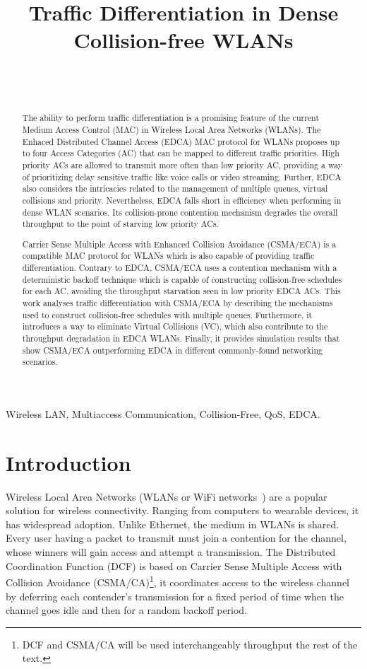\documentclass[a4paper,journal]{IEEEtran}
\title{Traffic Differentiation in Dense Collision-free WLANs}
\author{\IEEEauthorblockN{Luis Sanabria-Russo\IEEEauthorrefmark{0}, Boris Bellalta\IEEEauthorrefmark{0}}\\
      \IEEEauthorblockA{\IEEEauthorrefmark{0}Department of Information and Communication Technologies \\ Universitat Pompeu Fabra, Barcelona, Spain
      \\\ {\tt \{luis.sanabria,boris.bellalta\}@upf.edu}}\\
  }
\begin{document}
\maketitle

\begin{abstract}
The ability to perform traffic differentiation is a promising feature of the current Medium Access Control (MAC) in Wireless Local Area Networks (WLANs). The Enhaced Distributed Channel Access (EDCA) MAC protocol for WLANs proposes up to four Access Categories (AC) that can be mapped to different traffic priorities. High priority ACs are allowed to transmit more often than low priority AC, providing a way of prioritizing delay sensitive traffic like voice calls or video streaming. Further, EDCA also considers the intricacies related to the management of multiple queues, virtual collisions and priority. Nevertheless, EDCA falls short in efficiency when performing in dense WLAN scenarios. Its collision-prone contention mechanism degrades the overall throughput to the point of starving low priority ACs.

Carrier Sense Multiple Access with Enhanced Collision Avoidance (CSMA/ECA) is a compatible MAC protocol for WLANs which is also capable of providing traffic differentiation. Contrary to EDCA, CSMA/ECA uses a contention mechanism with a deterministic backoff technique which is capable of constructing collision-free schedules for each AC, avoiding the throughput starvation seen in low priority EDCA ACs. This work analyses traffic differentiation with CSMA/ECA by describing the mechanisms used to construct collision-free schedules with multiple queues. Furthermore, it introduces a way to eliminate Virtual Collisions (VC), which also contribute to the throughput degradation in EDCA WLANs. Finally, it provides simulation results that show CSMA/ECA outperforming EDCA in different commonly-found networking scenarios.
\end{abstract}

\begin{IEEEkeywords}
Wireless LAN, Multiaccess Communication, Collision-Free, QoS, EDCA.
\end{IEEEkeywords}

\section{Introduction}
Wireless Local Area Networks (WLANs or WiFi networks~\cite{802Standards}) are a popular solution for wireless connectivity. Ranging from computers to wearable devices, it has widespread adoption. Unlike Ethernet, the medium in WLANs is shared. Every user having a packet to transmit must join a contention for the channel, whose winners will gain access and attempt a transmission. The Distributed Coordination Function (DCF) is based on Carrier Sense Multiple Access with Collision Avoidance (CSMA/CA)\footnote{DCF and CSMA/CA will be used interchangeably throughput the rest of the text.}, it coordinates access to the wireless channel by deferring each contender's transmission for a fixed period of time when the channel goes idle and then for a random backoff period.
\end{document}
